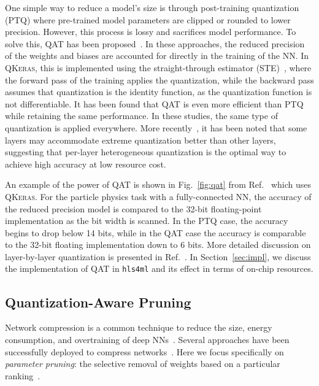 \documentclass[tinyml]{acmart}
\newcommand{\hlsfml}{\texttt{hls4ml}\xspace}
\begin{document}
One simple way to reduce a model's size is through post-training quantization (PTQ) where pre-trained model parameters are clipped or rounded to lower precision.
However, this process is lossy and sacrifices model performance.
To solve this, QAT has been proposed~\cite{bertmoons,NIPS2015_5647,ternary-16}.
In these approaches, the reduced precision of the weights and biases are accounted for directly in the training of the NN.
In \textsc{QKeras}, this is implemented using the straight-through estimator (STE)~\cite{NIPS2015_5647}, where the forward pass of the training applies the quantization, while the backward pass assumes that quantization is the identity function, as the quantization function is not differentiable.
It has been found that QAT is even more efficient than PTQ while retaining the same performance.
In these studies, the same type of quantization is applied everywhere.
More recently~\cite{haq,hawq}, it has been noted that some layers may accommodate extreme quantization better than other layers, suggesting that per-layer heterogeneous quantization is the optimal way to achieve high accuracy at low resource cost.

An example of the power of QAT is shown in Fig.~\ref{fig:qat} from Ref.~\cite{Coelho:2020zfu} which uses \textsc{QKeras}.
For the particle physics task with a fully-connected NN, the accuracy of the reduced precision model is compared to the 32-bit floating-point implementation as the bit width is scanned.
In the PTQ case, the accuracy begins to drop below 14 bits, while in the QAT case the accuracy is comparable to the 32-bit floating implementation down to 6 bits.
More detailed discussion on layer-by-layer quantization is presented in Ref.~\cite{Coelho:2020zfu}.
In Section~\ref{sec:impl}, we discuss the implementation of QAT in \hlsfml and its effect in terms of on-chip resources.

\subsection{Quantization-Aware Pruning}
\label{sec:qap}
Network compression is a common technique to reduce the size, energy consumption, and overtraining of deep NNs~\cite{DBLP:journals/corr/HanMD15}.
Several approaches have been successfully deployed to compress networks~\cite{DBLP:journals/corr/abs-1710-09282,9043731,review2020}.
Here we focus specifically on \textit{parameter pruning}: the selective removal of weights based on a particular ranking~\cite{NIPS1989_250,2017arXiv171201312L,DBLP:journals/corr/HanMD15,lotteryticket,learningraterewinding,stateofpruning}.
\end{document}
